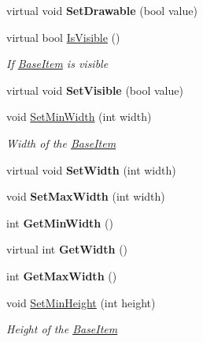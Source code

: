 \begin{DoxyCompactItemize}
virtual void {\bfseries Set\+Drawable} (bool value)
\item 
virtual bool \mbox{\hyperlink{class_space_v_i_l_1_1_base_item_a29b915d6e655b48a8b7505118441e961}{Is\+Visible}} ()
\begin{DoxyCompactList}\small\item\em If \mbox{\hyperlink{class_space_v_i_l_1_1_base_item}{Base\+Item}} is visible \end{DoxyCompactList}\item 
\mbox{\label{class_space_v_i_l_1_1_base_item_adaae3ba9b57ac31dca372950e77b02ea}} 
virtual void {\bfseries Set\+Visible} (bool value)
\item 
void \mbox{\hyperlink{class_space_v_i_l_1_1_base_item_a139384f2e49b221864f8a580973a21c1}{Set\+Min\+Width}} (int width)
\begin{DoxyCompactList}\small\item\em Width of the \mbox{\hyperlink{class_space_v_i_l_1_1_base_item}{Base\+Item}} \end{DoxyCompactList}\item 
\mbox{\label{class_space_v_i_l_1_1_base_item_a64c0166488ae312314e20359f6188ee8}} 
virtual void {\bfseries Set\+Width} (int width)
\item 
\mbox{\label{class_space_v_i_l_1_1_base_item_a156d8c92de44c966e01dc0af21908571}} 
void {\bfseries Set\+Max\+Width} (int width)
\item 
\mbox{\label{class_space_v_i_l_1_1_base_item_ab79fa09387e428483e8834b78f5aa2e8}} 
int {\bfseries Get\+Min\+Width} ()
\item 
\mbox{\label{class_space_v_i_l_1_1_base_item_a8da6083ef49330bb47c7924a889e18a7}} 
virtual int {\bfseries Get\+Width} ()
\item 
\mbox{\label{class_space_v_i_l_1_1_base_item_ad9990a214bf0c72bbf62c0ef766eb024}} 
int {\bfseries Get\+Max\+Width} ()
\item 
void \mbox{\hyperlink{class_space_v_i_l_1_1_base_item_a5dbc5edca77a56b7998c8cee6b0e9a3a}{Set\+Min\+Height}} (int height)
\begin{DoxyCompactList}\small\item\em Height of the \mbox{\hyperlink{class_space_v_i_l_1_1_base_item}{Base\+Item}} \end{DoxyCompactList}\item 

\end{DoxyCompactItemize}
